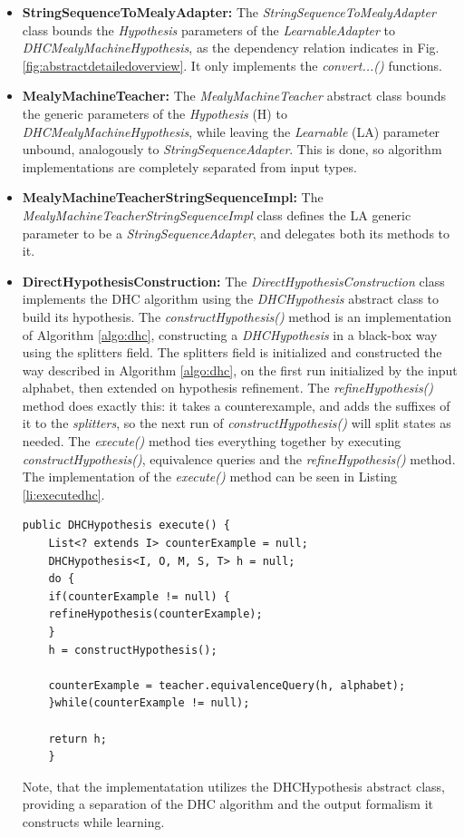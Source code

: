 \begin{itemize}
	\item \textbf{StringSequenceToMealyAdapter:} The \emph{StringSequenceToMealyAdapter} class bounds the \emph{Hypothesis} parameters of the \emph{LearnableAdapter} to \emph{DHCMealyMachineHypothesis}, as the dependency relation indicates in Fig. \ref{fig:abstractdetailedoverview}. It only implements the \emph{convert...()} functions.

	\item \textbf{MealyMachineTeacher:} The \emph{MealyMachineTeacher} abstract class bounds the generic parameters of the \emph{Hypothesis} (H) to \emph{DHCMealyMachineHypothesis}, while leaving the \emph{Learnable} (LA) parameter unbound, analogously to \emph{StringSequenceAdapter}. This is done, so algorithm implementations are completely separated from input types. 
	\item \textbf{MealyMachineTeacherStringSequenceImpl:} The \emph{MealyMachineTeacherStringSequenceImpl} class defines the LA generic parameter to be a \emph{StringSequenceAdapter}, and delegates both its methods to it.
	 
	\item \textbf{DirectHypothesisConstruction:} The \emph{DirectHypothesisConstruction} class implements the DHC algorithm using the \emph{DHCHypothesis} abstract class to build its hypothesis. The \emph{constructHypothesis()} method is an implementation of Algorithm \ref{algo:dhc}, constructing a \emph{DHCHypothesis} in a black-box way using the splitters field. The splitters field is initialized and constructed the way described in Algorithm \ref{algo:dhc}, on the first run initialized by the input alphabet, then extended on hypothesis refinement. The \emph{refineHypothesis()} method does exactly this: it takes a counterexample, and adds the suffixes of it to the \emph{splitters}, so the next run of \emph{constructHypothesis()} will split states as needed. The \emph{execute()} method ties everything together by executing \emph{constructHypothesis()}, equivalence queries and the \emph{refineHypothesis()} method. The implementation of the \emph{execute()} method can be seen in Listing \ref{li:executedhc}.\\
	\begin{lstlisting}[caption=The \emph{execute()} function of the DHC algorithm implementation described in Section \ref{item:stringsequencelearnable}s \emph{DirectHypothesisConstruction} item.,label=li:executedhc]
	public DHCHypothesis execute() {
	List<? extends I> counterExample = null;
	DHCHypothesis<I, O, M, S, T> h = null;
	do {
	if(counterExample != null) {
	refineHypothesis(counterExample);
	}
	h = constructHypothesis();
	
	counterExample = teacher.equivalenceQuery(h, alphabet);
	}while(counterExample != null);
	
	return h;
	}
	\end{lstlisting}
	Note, that the implementatation utilizes the DHCHypothesis abstract class, providing a separation of the DHC algorithm and the output formalism it constructs while learning.
\end{itemize}




